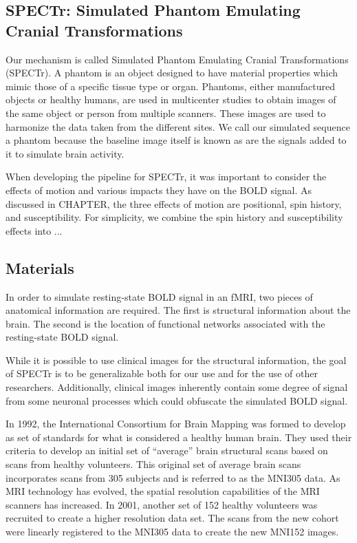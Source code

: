 \subsection{SPECTr: Simulated Phantom Emulating Cranial Transformations}

Our mechanism is called Simulated Phantom Emulating Cranial Transformations (SPECTr). A phantom is an object designed to have material properties which mimic those of a specific tissue type or organ. Phantoms, either manufactured objects or healthy humans, are used in multicenter studies to obtain images of the same object or person from multiple scanners. These images are used to harmonize the data taken from the different sites. We call our simulated sequence a phantom because the baseline image itself is known as are the signals added to it to simulate brain activity. 

When developing the pipeline for SPECTr, it was important to consider the effects of motion and various impacts they have on the BOLD signal. As discussed in CHAPTER, the three effects of motion are positional, spin history, and susceptibility. For simplicity, we combine the spin history and susceptibility effects into ...

\subsection{Materials}

In order to simulate resting-state BOLD signal in an fMRI, two pieces of anatomical information are required. The first is structural information about the brain. The second is the location of functional networks associated with the resting-state BOLD signal.

While it is possible to use clinical images for the structural information, the goal of SPECTr is to be generalizable both for our use and for the use of other researchers. Additionally, clinical images inherently contain some degree of signal from some neuronal processes which could obfuscate the simulated BOLD signal. 

In 1992, the International Consortium for Brain Mapping was formed to develop as set of standards for what is considered a healthy human brain. They used their criteria to develop an initial set of ``average'' brain structural scans based on scans from healthy volunteers. This original set of average brain scans incorporates scans from 305 subjects and is referred to as the MNI305 data. As MRI technology has evolved, the spatial resolution capabilities of the MRI scanners has increased. In 2001, another set of 152 healthy volunteers was recruited to create a higher resolution data set. The scans from the new cohort were linearly registered to the MNI305 data to create the new MNI152 images. %

